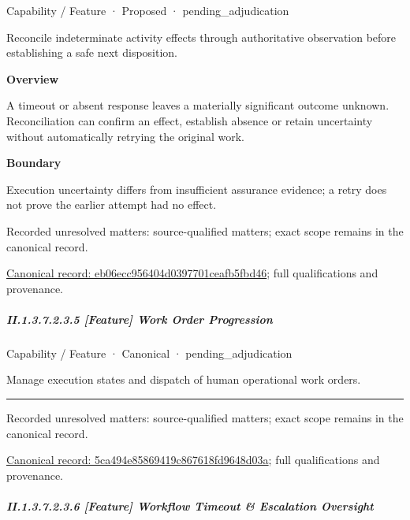 \label{element:eb06ecc956404d0397701ceafb5fbd46}
{\small Capability / Feature · Proposed · pending\_adjudication}\par

Reconcile indeterminate activity effects through authoritative observation before establishing a safe next disposition.



\textbf{Overview}



A timeout or absent response leaves a materially significant outcome unknown. Reconciliation can confirm an effect, establish absence or retain uncertainty without automatically retrying the original work.



\textbf{Boundary}



Execution uncertainty differs from insufficient assurance evidence; a retry does not prove the earlier attempt had no effect.


{\small Recorded unresolved matters: source-qualified matters; exact scope remains in the canonical record.}\par
{\footnotesize \href{../../../../../../../continuum/strategy/capability/feature/eb06ecc956404d0397701ceafb5fbd46.md}{Canonical record: eb06ecc956404d0397701ceafb5fbd46}; full qualifications and provenance.}\par
\subparagraph*{II.1.3.7.2.3.5 [Feature] Work Order Progression}
\label{navigation:II.1.3.7.2.3.5}

\label{element:5ca494e85869419c867618fd9648d03a}
{\small Capability / Feature · Canonical · pending\_adjudication}\par

Manage execution states and dispatch of human operational work orders.



\medskip\hrule\medskip

{\small Recorded unresolved matters: source-qualified matters; exact scope remains in the canonical record.}\par
{\footnotesize \href{../../../../../../../continuum/strategy/capability/feature/5ca494e85869419c867618fd9648d03a.md}{Canonical record: 5ca494e85869419c867618fd9648d03a}; full qualifications and provenance.}\par
\subparagraph*{II.1.3.7.2.3.6 [Feature] Workflow Timeout \& Escalation Oversight}
\label{navigation:II.1.3.7.2.3.6}

